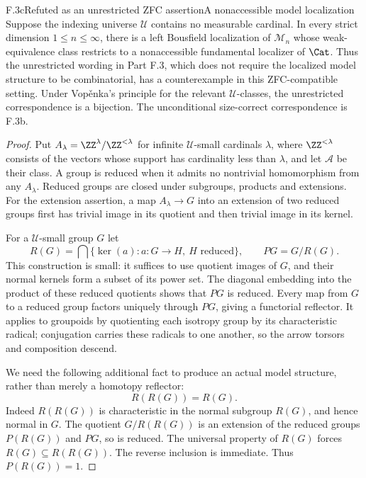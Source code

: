 \begin{claim}{F.3c}{Refuted as an unrestricted ZFC assertion}{A nonaccessible model localization}
Suppose the indexing universe $\mathcal U$ contains no measurable
cardinal. In every strict dimension $1\leq n\leq\infty$, there
is a left Bousfield localization of $\mathcal M_n$ whose
weak-equivalence class restricts to a nonaccessible fundamental
localizer of $\Cat$. Thus the unrestricted wording in Part F.3,
which does not require the localized model structure to be
combinatorial, has a counterexample in this ZFC-compatible setting.
Under Vop\v{e}nka's principle for the relevant $\mathcal U$-classes,
the unrestricted correspondence is a bijection. The unconditional
size-correct correspondence is F.3b.
\end{claim}
\begin{proof}
Put $A_\lambda=\ZZ^\lambda/\ZZ^{<\lambda}$ for infinite
$\mathcal U$-small cardinals $\lambda$, where $\ZZ^{<\lambda}$
consists of the vectors whose support has cardinality less than
$\lambda$, and let $\mathcal A$
be their class. A group is reduced when it admits no nontrivial
homomorphism from any $A_\lambda$. Reduced groups are closed
under subgroups, products and extensions. For the extension
assertion, a map $A_\lambda\to G$ into an extension of two
reduced groups first has trivial image in its quotient and then
trivial image in its kernel.

For a $\mathcal U$-small group $G$ let
\[
 R(G)=\bigcap\{\ker(a):a:G\to H,\ H\text{ reduced}\},
 \qquad P G=G/R(G).
\]
This construction is small: it suffices to use quotient images
of $G$, and their normal kernels form a subset of its power set.
The diagonal embedding into the product of these reduced quotients
shows that $PG$ is reduced. Every map from $G$ to a reduced group
factors uniquely through $PG$, giving a functorial reflector.
It applies to groupoids by quotienting each isotropy group by its
characteristic radical; conjugation carries these radicals to
one another, so the arrow torsors and composition descend.

We need the following additional fact to produce an actual model
structure, rather than merely a homotopy reflector:
\[
                 R(R(G))=R(G).                              \tag{F.3.3}
\]
Indeed $R(R(G))$ is characteristic in the normal subgroup $R(G)$,
and hence normal in $G$. The quotient $G/R(R(G))$ is an extension
of the reduced groups $P(R(G))$ and $PG$, so is reduced. The
universal property of $R(G)$ forces $R(G)\subseteq R(R(G))$.
The reverse inclusion is immediate. Thus $P(R(G))=1$.


\end{proof}
